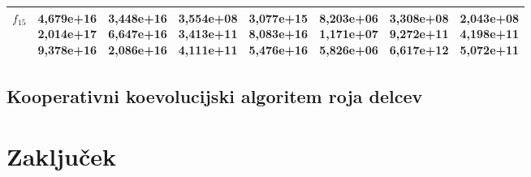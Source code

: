 \begin{table}[t]
\begin{small}
\begin{tabular}{|c|c|c|c|c|c|c|c|}
        $f_{15}$ & \makecell{4,679e+16 \\ 2,014e+17 \\ 9,378e+16} & \makecell{3,448e+16 \\ 6,647e+16 \\ 2,086e+16} & \makecell{3,554e+08 \\ 3,413e+11 \\ 4,111e+11} & \makecell{3,077e+15 \\ 8,083e+16 \\ 5,476e+16} & \makecell{\textbf{8,203e+06} \\ \textbf{1,171e+07} \\ 5,826e+06} & \makecell{3,308e+08 \\ 9,272e+11 \\ 6,617e+12} & \makecell{2,043e+08 \\ 4,198e+11 \\ 5,072e+11} \\\hline
    \end{tabular}
\end{small}
\end{table}


\section{Kooperativni koevolucijski algoritem roja delcev}


\chapter{Zaključek}\label{chap:end}

